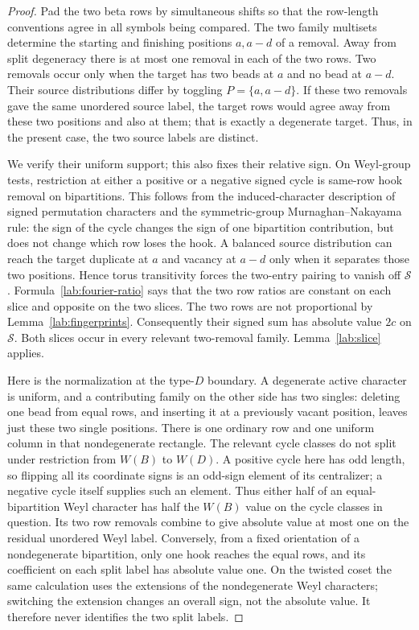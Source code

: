 \begin{proof}
Pad the two beta rows by simultaneous shifts so that the row-length
conventions agree in all symbols being compared.  The two family
multisets determine the starting and finishing positions
$a,a-d$ of a removal.  Away from split degeneracy there is at
most one removal in each of the two rows.  Two removals occur
only when the target has two beads at $a$ and no bead at $a-d$.
Their source distributions differ by toggling
$P=\{a,a-d\}$.  If these two removals gave the same unordered
source label, the target rows would agree away from these two
positions and also at them; that is exactly a degenerate target.
Thus, in the present case, the two source labels are distinct.

We verify their uniform support; this also fixes their relative
sign.  On Weyl-group tests, restriction at either a positive or
a negative signed cycle is same-row hook removal on bipartitions.
This follows from the induced-character description of signed
permutation characters and the symmetric-group
Murnaghan--Nakayama rule: the sign of the cycle changes the sign
of one bipartition contribution, but does not change which row
loses the hook.  A balanced source distribution can reach the
target duplicate at $a$ and vacancy at $a-d$ only when it
separates those two positions.  Hence torus transitivity forces
the two-entry pairing to vanish off $\mathcal S$.
Formula~\eqref{lab:fourier-ratio} says that the two row ratios are
constant on each slice and opposite on the two slices.  The two
rows are not proportional by Lemma~\ref{lab:fingerprints}.
Consequently their signed sum has absolute value $2c$ on
$\mathcal S$.  Both slices occur in every relevant two-removal
family.  Lemma~\ref{lab:slice} applies.

Here is the normalization at the type-$D$ boundary.  A degenerate
active character is uniform, and a contributing family on the
other side has two singles: deleting one bead from equal rows,
and inserting it at a previously vacant position, leaves just
these two single positions.  There is one ordinary row and one
uniform column in that nondegenerate rectangle.  The relevant
cycle classes do not split under restriction from $W(B)$ to
$W(D)$.  A positive cycle here has odd length, so flipping all
its coordinate signs is an odd-sign element of its centralizer;
a negative cycle itself supplies such an element.  Thus either
half of an equal-bipartition Weyl character has half the $W(B)$
value on the cycle classes in question.  Its two row removals
combine to give absolute value at most one on the residual
unordered Weyl label.  Conversely, from a fixed orientation of
a nondegenerate bipartition, only one hook reaches the equal
rows, and its coefficient on each split label has absolute value
one.  On the twisted coset the same calculation uses the
extensions of the nondegenerate Weyl characters; switching the
extension changes an overall sign, not the absolute value.
It therefore never identifies the two split labels.


\end{proof}
